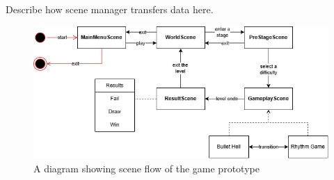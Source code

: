 \vspace{0.5cm}

\noindent Describe how scene manager transfers data here.

\vspace{0.5cm}

\begin{figure}[h]
    \centering
    \includegraphics[width=\columnwidth, keepaspectratio]{images/gameflow}
    \caption{A diagram showing scene flow of the game prototype}
    \label{fig:gameflow}
\end{figure}

\vspace{0.5cm}


